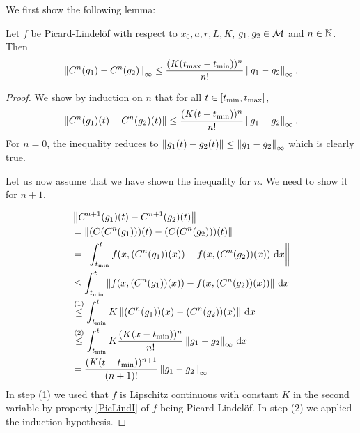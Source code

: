 We first show the following lemma: 

\begin{lem}\label{lem:contraction}
Let $f$ be Picard-Lindelöf with respect to $x_0, a, r, L, K$, $g_1, g_2 \in \mathcal{M}$ and $n \in \mathbb{N}$.
Then 
\begin{equation*}
    \left\lVert C^n(g_1) - C^n(g_2)\right\rVert_\infty \le \frac{(K(t_{\text{max}} - t_{\text{min}}))^n}{n!}\left\lVert g_1 - g_2\right\rVert_\infty.
\end{equation*}
\end{lem}
\begin{proof}
We show by induction on $n$ that for all $t \in [t_{\text{min}}, t_{\text{max}}]$, 
\begin{equation*}
    \left\lVert C^n(g_1)(t) - C^n(g_2)(t)\right\rVert \le \frac{(K(t - t_{\text{min}}))^n}{n!}\left\lVert g_1 - g_2\right\rVert_\infty.
\end{equation*}
For $n = 0$, the inequality reduces to $\left\lVert g_1(t) - g_2(t)\right\rVert \le \left\lVert g_1 - g_2\right\rVert_\infty$ which is clearly true.

Let us now assume that we have shown the inequality for $n$.
We need to show it for $n + 1$. 

\begin{equation*}
    \begin{split}
        &\left\lVert C^{n + 1}(g_1)(t) - C^{n + 1}(g_2)(t)\right\rVert \\ 
        &= \left\lVert(C (C^n(g_1))) (t) - (C (C^n(g_2))) (t)\right\rVert \\ 
        &= \left\lVert\int_{t_{\text{min}}}^t f(x, (C^n(g_1))(x)) - f(x, (C^n(g_2))(x)) \mathop{}\mathrm{d} x\right\rVert \\ 
        &\le \int_{t_{\text{min}}}^t \left\lVert f(x, (C^n(g_1))(x)) - f(x, (C^n(g_2))(x))\right\rVert \mathop{}\mathrm{d} x \\
        &\stackrel{(1)}{\le} \int_{t_{\text{min}}}^t K\left\lVert(C^n(g_1))(x) - (C^n(g_2))(x)\right\rVert \mathop{}\mathrm{d} x \\
        &\stackrel{(2)}{\le} \int_{t_{\text{min}}}^t K\frac{(K(x - t_{\text{min}}))^n}{n!}\left\lVert g_1 - g_2\right\rVert_\infty \mathop{}\mathrm{d} x \\
        &= \frac{(K(t - t_{\text{min}}))^{n + 1}}{(n + 1)!}\left\lVert g_1 - g_2\right\rVert_\infty
    \end{split}
\end{equation*}
In step (1) we used that $f$ is Lipschitz continuous with constant $K$ in the second variable by property \ref{PicLindI} of $f$ being Picard-Lindelöf. 
In step (2) we applied the induction hypothesis. 
\end{proof}

